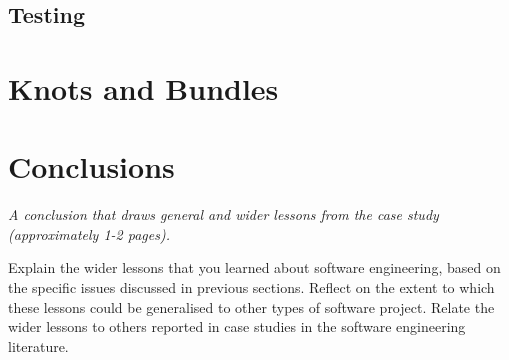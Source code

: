 \documentclass{l3proj}
\begin{document}
\subsection{Testing}


\section{Knots and Bundles}


\section{Conclusions}

\textit{A conclusion that draws general and wider lessons from the case study (approximately 1-2 pages).}

Explain the wider lessons that you learned about software engineering,
based on the specific issues discussed in previous sections.  Reflect
on the extent to which these lessons could be generalised to other
types of software project.  Relate the wider lessons to others
reported in case studies in the software engineering literature.



\end{document}
